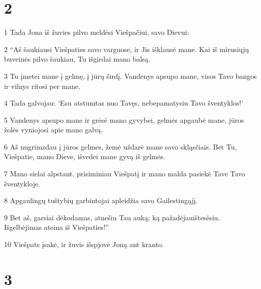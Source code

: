 \chapter{2}


\par 1 Tada Jona iš žuvies pilvo meldėsi Viešpačiui, savo Dievui: 
\par 2 “Aš šaukiausi Viešpaties savo varguose, ir Jis išklausė mane. Kai iš mirusiųjų buveinės pilvo šaukiau, Tu išgirdai mano balsą. 
\par 3 Tu įmetei mane į gelmę, į jūrų širdį. Vandenys apsupo mane, visos Tavo bangos ir vilnys ritosi per mane. 
\par 4 Tada galvojau: ‘Esu atstumtas nuo Tavęs, nebepamatysiu Tavo šventyklos!’ 
\par 5 Vandenys apsupo mane ir grėsė mano gyvybei, gelmės apgaubė mane, jūros žolės vyniojosi apie mano galvą. 
\par 6 Aš nugrimzdau į jūros gelmes, žemė uždarė mane savo skląsčiais. Bet Tu, Viešpatie, mano Dieve, išvedei mane gyvą iš gelmės. 
\par 7 Mano sielai alpstant, prisiminiau Viešpatį ir mano malda pasiekė Tave Tavo šventykloje. 
\par 8 Apgaulingų tuštybių garbintojai apleidžia savo Gailestingąjį. 
\par 9 Bet aš, garsiai dėkodamas, atnešiu Tau auką; ką pažadėjau­ištesėsiu. Išgelbėjimas ateina iš Viešpaties!” 
\par 10 Viešpats įsakė, ir žuvis išspjovė Joną ant kranto.



\chapter{3}


